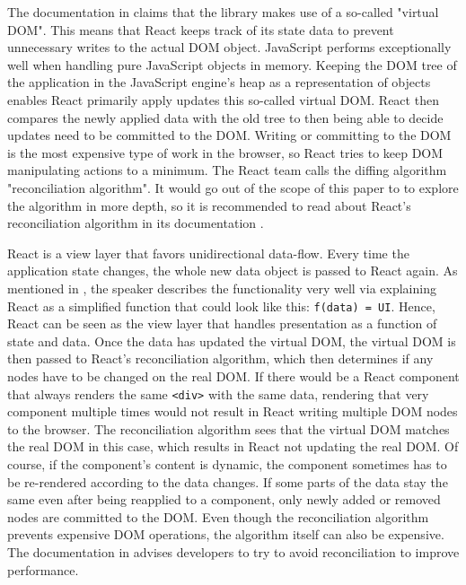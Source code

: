 The documentation in \cite[/docs]{React} claims that the library makes use of a so-called "virtual DOM". This means that React keeps track of its state data to prevent unnecessary writes to the actual DOM object. JavaScript performs exceptionally well when handling pure JavaScript objects in memory. Keeping the DOM tree of the application in the JavaScript engine's heap as a representation of objects enables React primarily apply updates this so-called virtual DOM. React then compares the newly applied data with the old tree to then being able to decide updates need to be committed to the DOM. Writing or committing to the DOM is the most expensive type of work in the browser, so React tries to keep DOM manipulating actions to a minimum. The React team calls the diffing algorithm "reconciliation algorithm". It would go out of the scope of this paper to to explore the algorithm in more depth, so it is recommended to read about React's reconciliation algorithm in its documentation \cite[/docs]{React}.

React is a view layer that favors unidirectional data-flow. Every time the application state changes, the whole new data object is passed to React again. As mentioned in \cite[6:50]{ReactFoundingVideo}, the speaker describes the functionality very well via explaining React as a simplified function that could look like this: \texttt{f(data) = UI}. Hence, React can be seen as the view layer that handles presentation as a function of state and data. Once the data has updated the virtual DOM, the virtual DOM is then passed to React's reconciliation algorithm, which then determines if any nodes have to be changed on the real DOM. If there would be a React component that always renders the same \texttt{<div>} with the same data, rendering that very component multiple times would not result in React writing multiple DOM nodes to the browser. The reconciliation algorithm sees that the virtual DOM matches the real DOM in this case, which results in React not updating the real DOM. Of course, if the component's content is dynamic, the component sometimes has to be re-rendered according to the data changes. If some parts of the data stay the same even after being reapplied to a component, only newly added or removed nodes are committed to the DOM. Even though the reconciliation algorithm prevents expensive DOM operations, the algorithm itself can also be expensive. The documentation in \cite[/docs/optimizing-performance.html\#avoid-reconciliation]{React} advises developers to try to avoid reconciliation to improve performance.

